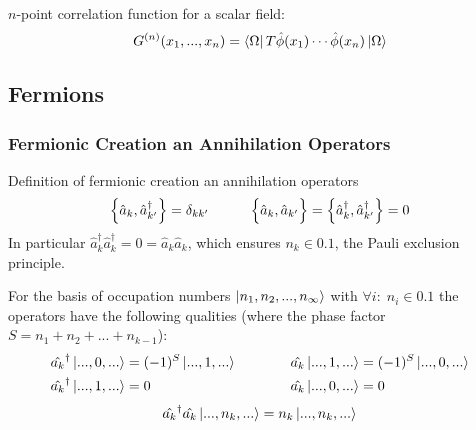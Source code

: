 			\noindent
			$n$-point correlation function for a scalar field:
			\begin{equation}
				G^{(n)}(x_1, ..., x_n) = \Bra{\Omega} T \hat{\phi}(x_1) \dotsb \hat{\phi}(x_n) \Ket{\Omega}
			\end{equation}

					
	\subsection{Fermions}
		\subsubsection{Fermionic Creation an Annihilation Operators}
		\label{Sec:FermionicCreationAndAnnihilationOperators}
			Definition of fermionic creation an annihilation operators
			\begin{equation}
				\acomm{\hat{a}_k}{\hat{a}_{k'}^\dagger} = \delta_{kk'}
				\hsp
				\Big\lbrace\hat{a}_k,\hat{a}_{k'}\Big\rbrace = \acomm{\hat{a}_k^\dagger}{\hat{a}_{k'}^\dagger} = 0
			\end{equation}
			In particular $\hat{a}_k^\dagger \hat{a}_k^\dagger = 0 = \hat{a}_k \hat{a}_k$, which ensures $n_k\in\qty{0,1}$, \ie the Pauli exclusion principle.

			\noindent
			For the basis of occupation numbers $\Ket{n_1, n_2, ..., n_\infty}$ with $\forall i:\;n_i\in \qty{0,1}$ the operators have the following qualities (where the phase factor $S = n_1 + n_2 + ... + n_{k-1}$):
			\begin{equation}
				\begin{aligned}
					\hat{a_k}^\dagger \Ket{...,0,...} &= (-1)^S \Ket{...,1,...}
					&\hspace{30pt}
					\hat{a_k} \Ket{...,1,...} &= (-1)^S \Ket{...,0,...}
					\\
					\hat{a_k}^\dagger \Ket{...,1,...} &= 0
					&\hspace{30pt}
					\hat{a_k} \Ket{...,0,...} &= 0
				\end{aligned}
			\end{equation}
			\begin{equation}
				\hat{a_k}^\dagger \hat{a_k} \Ket{...,n_k,...} = n_k \Ket{...,n_k,...}				
			\end{equation}

